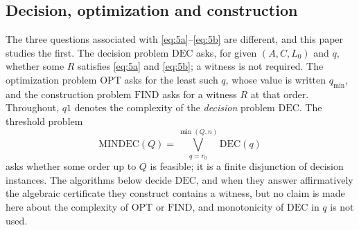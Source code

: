 \subsection{Decision, optimization and construction}\label{sec:problems}

The three questions associated with \eqref{eq:5a}--\eqref{eq:5b} are different, and this
paper studies the first. The decision problem $\mathrm{DEC}$ asks, for given
$(A,C,L_0)$ and $q$, whether some $R$ satisfies \eqref{eq:5a} and \eqref{eq:5b}; a witness
is not required. The optimization problem $\mathrm{OPT}$ asks for the least such $q$, whose
value is written $q_{\min}$, and the construction problem $\mathrm{FIND}$ asks for a
witness $R$ at that order. Throughout, $q1$ denotes the complexity of the \emph{decision}
problem $\mathrm{DEC}$. The threshold problem
\begin{equation}\label{eq:mindec}
\mathrm{MINDEC}(Q)=\bigvee_{q=r_0}^{\min(Q,n)}\mathrm{DEC}(q)
\end{equation}
asks whether some order up to $Q$ is feasible; it is a finite disjunction of decision
instances. The algorithms below decide $\mathrm{DEC}$, and when they answer affirmatively
the algebraic certificate they construct contains a witness, but no claim is made here
about the complexity of $\mathrm{OPT}$ or $\mathrm{FIND}$, and monotonicity of
$\mathrm{DEC}$ in $q$ is not used.
